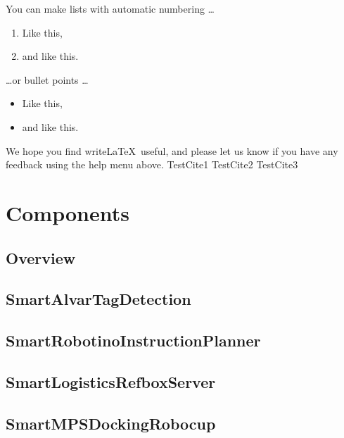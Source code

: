 \documentclass[12pt]{article}
\begin{document}
You can make lists with automatic numbering \dots

\begin{enumerate}
\item Like this,
\item and like this.
\end{enumerate}
\dots or bullet points \dots
\begin{itemize}
\item Like this,
\item and like this.
\end{itemize}

We hope you find write\LaTeX\ useful, and please let us know if you have any feedback using the help menu above. 
TestCite1 \cite{bir} 
TestCite2 \cite{pycl} 
TestCite3 \cite{spata}

\section{Components}

\subsection{Overview}
	
	
\subsection{SmartAlvarTagDetection}
	
	
\subsection{SmartRobotinoInstructionPlanner}
	

\subsection{SmartLogisticsRefboxServer}
	
	
\subsection{SmartMPSDockingRobocup}
	

\printbibliography
\end{document}
